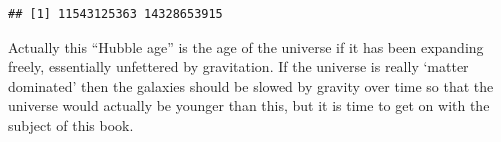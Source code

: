 \documentclass[
]{article}
\begin{document}
\begin{verbatim}
## [1] 11543125363 14328653915
\end{verbatim}

Actually this ``Hubble age'' is the age of the universe if it has been
expanding freely, essentially unfettered by gravitation. If the universe
is really `matter dominated' then the galaxies should be slowed by
gravity over time so that the universe would actually be younger than
this, but it is time to get on with the subject of this book.
\end{document}
